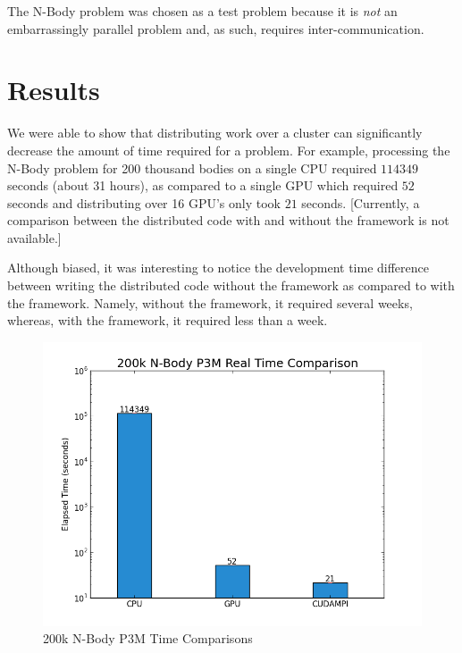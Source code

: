 \documentclass{acm_proc_article-sp}
\begin{document}
The N-Body problem was chosen as a test problem because it is \emph{not} an
embarrassingly parallel problem and, as such, requires inter-communication.

\section{Results}

We were able to show that distributing work over a cluster can significantly
decrease the amount of time required for a problem. For example, processing the
N-Body problem for 200 thousand bodies on a single CPU required $114349$
seconds (about 31 hours), as compared to a single GPU which required $52$
seconds and distributing over 16 GPU's only took $21$ seconds. [Currently, a
comparison between the distributed code with and without the framework is not
available.]

Although biased, it was interesting to notice the development time difference
between writing the distributed code without the framework as compared to with
the framework. Namely, without the framework, it required several weeks,
whereas, with the framework, it required less than a week.

\begin{figure}
\includegraphics[scale=0.4]{200k_bar_chart.png}
\caption{200k N-Body P3M Time Comparisons}
\end{figure}
\end{document}
